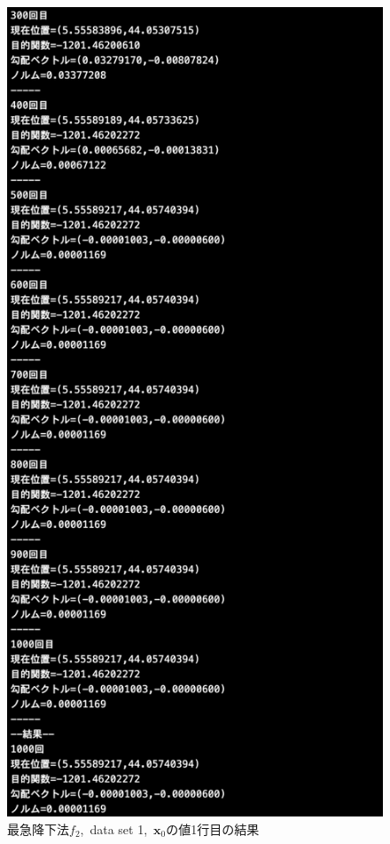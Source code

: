 \documentclass[12pt]{jarticle}
\begin{document}
\begin{figure}[h]
\begin{minipage}{0.5\hsize}
    \end{minipage}
    \begin{minipage}{0.5\hsize}
        \begin{center}
            \includegraphics[scale=0.2]{kadai1_2s_out1_1_3.png}
        \end{center}
    \end{minipage}
    \caption{最急降下法$f_2$,\ data set 1,\ $\boldsymbol{x}_0$の値1行目の結果}
\end{figure}
\end{document}
